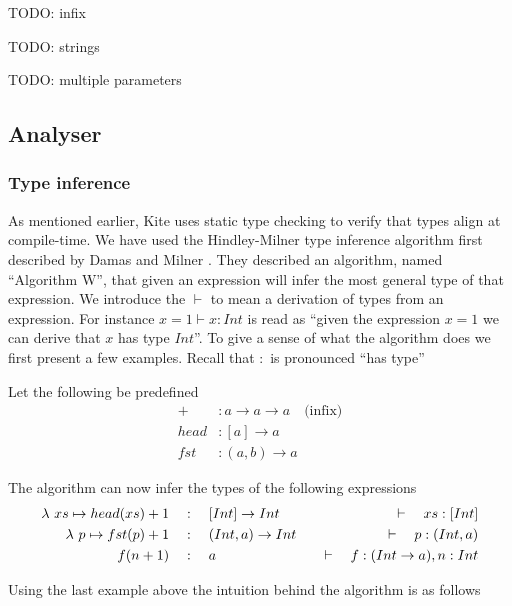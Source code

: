 TODO: infix

TODO: strings

TODO: multiple parameters

\subsection{Analyser}

\subsubsection{Type inference}

As mentioned earlier, Kite uses static type checking to verify that types align at compile-time. We have used the Hindley-Milner type inference algorithm first described by Damas and Milner \cite{milner82}. They described an algorithm, named ``Algorithm W'', that given an expression will infer the most general type of that expression. We introduce the $\vdash$ to mean a derivation of types from an expression. For instance $x = 1 \vdash x : Int$ is read as ``given the expression $x = 1$ we can derive that $x$ has type $Int$''. To give a sense of what the algorithm does we first present a few examples. Recall that $:$ is pronounced ``has type''

Let the following be predefined
\begin{align*}
  +      & : a \to a \to a   \quad\text{(infix)}\\
  head   & : [a] \to a   \\
  fst    & : (a, b) \to a
\end{align*}

The algorithm can now infer the types of the following expressions
\begin{align*}
  \lambda{} \ xs \mapsto{} head(xs) + 1 & \quad:\quad [Int] \to Int    & \quad\vdash\quad xs : [Int]             \\
  \lambda{} \ p \mapsto{} fst(p) + 1    & \quad:\quad (Int, a) \to Int & \quad\vdash\quad p : (Int, a)           \\
  f(n + 1)              & \quad:\quad a                & \quad\vdash\quad f: (Int \to a), n: Int \\
\end{align*}

Using the last example above the intuition behind the algorithm is as follows

